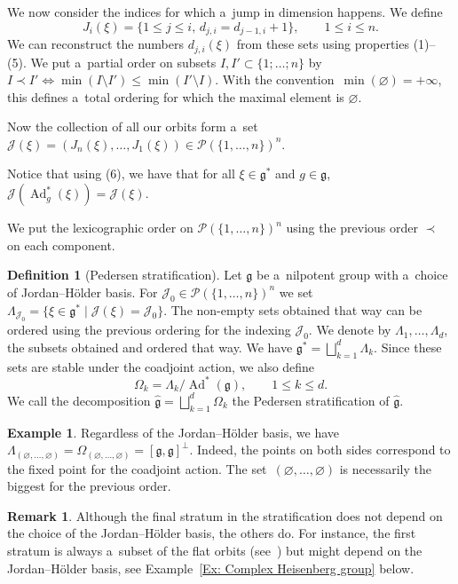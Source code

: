\documentclass[pdftex]{sigma}
\newcommand{\Ad}{\operatorname{Ad}} %
\newcommand{\g}{\mathfrak{g}} %
\numberwithin{equation}{section}
\theoremstyle{definition}
\newtheorem{mydef}[thm]{Definition}
\newtheorem{ex}[thm]{Example}
\newtheorem{rem}[thm]{Remark}
\begin{document}
We now consider the indices for which a~jump in dimension happens. We define
\[J_i(\xi) = \{1\leq j \leq i,\, d_{j,i} = d_{j-1,i} +1 \},\qquad 1\leq i \leq n.\]
We can reconstruct the numbers $d_{j,i}(\xi)$ from these sets using properties (1)--(5). We put a~partial order on subsets $I, I' \subset \{1;\dots;n\}$ by $I\prec I' \Leftrightarrow \min(I\setminus I') \leq \min(I' \setminus I)$.
With the convention~${\min(\varnothing) = +\infty}$, this defines a~total ordering for which the maximal element is $\varnothing$.

Now the collection of all our orbits form a~set $\mathcal{J}(\xi)= (J_n(\xi),\dots,J_1(\xi)) \in \mathcal{P}(\{1,\dots,n\})^n$.

Notice that using (6), we have that for all $\xi \in \g^*$ and $g\in \g$, $\mathcal{J}(\Ad^*_g(\xi)) = \mathcal{J}(\xi)$.

We put the lexicographic order on $\mathcal{P}(\{1,\dots,n\})^n$ using the previous order $\prec$ on each component.

\begin{mydef}[Pedersen stratification]
 Let $\g$ be a~nilpotent group with a~choice of Jordan--H\"older basis. For $\mathcal{J}_0 \in \mathcal{P}(\{1,\dots,n\})^n$ we set $\Lambda_{\mathcal{J}_0} = \{\xi \in \g^* \mid \mathcal{J}(\xi) = \mathcal{J}_0\}$. The non-empty sets obtained that way can be ordered using the previous ordering for the indexing $\mathcal{J}_0$. We denote by $\Lambda_1, \dots, \Lambda_d$,
 the subsets obtained and ordered that way. We have $\g^* = \bigsqcup_{k = 1}^d \Lambda_k$. Since these sets are stable under the coadjoint action, we also define
 \[\Omega_k =  {\Lambda_k}/{\Ad^*(\g)},\qquad 1\leq k \leq d.\]
 We call the decomposition $\widehat{\g} = \bigsqcup_{k = 1}^d \Omega_k$ the Pedersen stratification of $\widehat{\g}$.
\end{mydef}

\begin{ex}
 Regardless of the Jordan--H\"older basis, we have $\Lambda_{(\varnothing,\dots,\varnothing)} = \Omega_{(\varnothing,\dots,\varnothing)} = [\g,\g]^{\perp}$.
 Indeed, the points on both sides correspond to the fixed point for the coadjoint action. The set~${(\varnothing,\dots,\varnothing)}$ is necessarily the biggest for the previous order.
\end{ex}

\begin{rem}
 Although the final stratum in the stratification does not depend on the choice of the Jordan--H\"older basis, the others do. For instance, the first stratum is always a~subset of the flat orbits (see~\cite{GoffengKuzmin}) but might depend on the Jordan--H\"older basis, see Example~\ref{Ex: Complex Heisenberg group} below.
\end{rem}
\end{document}
